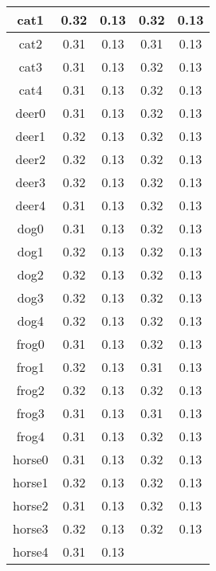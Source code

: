 \begin{longtable} {| c | c | c | c | c |}
 \hline
cat1 	\cellcolor{light-gray}	
& 0.32	
& 0.13
& 0.32	
& 0.13\\
 \hline
cat2 	\cellcolor{light-gray}	
& 0.31	
& 0.13
& 0.31 	
& 0.13\\
 \hline
cat3 	\cellcolor{light-gray}	
& 0.31	
& 0.13
& 0.32 	
& 0.13\\
 \hline
cat4 	\cellcolor{light-gray}	
& 0.31	
& 0.13
& 0.32 	
& 0.13\\
 \hline
deer0\cellcolor{light-gray} 	
& 0.31	
& 0.13
& 0.32 	
& 0.13\\
 \hline
deer1\cellcolor{light-gray} 	
& 0.32	
& 0.13
& 0.32 	
& 0.13\\
 \hline
deer2\cellcolor{light-gray} 	
& 0.32	
& 0.13
& 0.32 	
& 0.13\\
 \hline
deer3\cellcolor{light-gray} 			
& 0.32	
& 0.13
& 0.32	
& 0.13\\
 \hline
deer4\cellcolor{light-gray} 	
& 0.31	
& 0.13
& 0.32 	
& 0.13\\
 \hline
dog0 \cellcolor{light-gray}	
& 0.31	
& 0.13
& 0.32	
& 0.13\\
 \hline
dog1 \cellcolor{light-gray}	
& 0.32	
& 0.13
& 0.32 	
& 0.13\\
 \hline
dog2 \cellcolor{light-gray}	
& 0.32	
& 0.13
& 0.32 	
& 0.13\\
 \hline
dog3 \cellcolor{light-gray}	
& 0.32	
& 0.13
& 0.32 	
& 0.13\\
 \hline
dog4 \cellcolor{light-gray}	
& 0.32	
& 0.13
& 0.32 	
& 0.13\\
 \hline
frog0 \cellcolor{light-gray}	
& 0.31	
& 0.13
& 0.32 	
& 0.13\\
 \hline
frog1 \cellcolor{light-gray}	
& 0.32	
& 0.13
& 0.31 	
& 0.13\\
 \hline
frog2 \cellcolor{light-gray}	
& 0.32	
& 0.13
& 0.32 	
& 0.13\\
 \hline
frog3 \cellcolor{light-gray}	
& 0.31	
& 0.13
& 0.31 	
& 0.13\\
 \hline
frog4 \cellcolor{light-gray}	
& 0.31	
& 0.13
& 0.32 	
& 0.13\\
 \hline
horse0 \cellcolor{light-gray} 	
& 0.31	
& 0.13
& 0.32 	
& 0.13\\
 \hline
horse1 \cellcolor{light-gray}	
& 0.32	
& 0.13
& 0.32	
& 0.13\\
 \hline
horse2 \cellcolor{light-gray}	
& 0.31	
& 0.13
& 0.32 	
& 0.13\\
 \hline
horse3 \cellcolor{light-gray}	
& 0.32	
& 0.13
& 0.32 	
& 0.13\\
 \hline
horse4 \cellcolor{light-gray}	
& 0.31	
& 0.13

\end{longtable}
